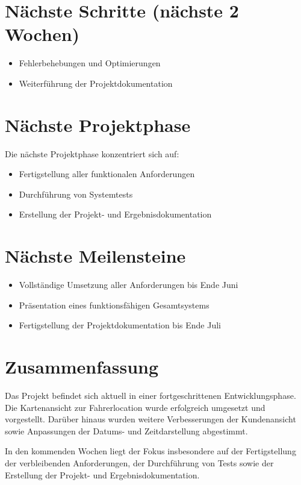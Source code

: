 \documentclass[a4paper,11pt]{article}
\begin{document}
\vspace{0.5cm}

\section{Nächste Schritte (nächste 2 Wochen)}

\begin{itemize}[leftmargin=1.2cm]
\item Fehlerbehebungen und Optimierungen
\item Weiterführung der Projektdokumentation
\end{itemize}

\vspace{0.5cm}

\section{Nächste Projektphase}

Die nächste Projektphase konzentriert sich auf:

\begin{itemize}[leftmargin=1.2cm]
\item Fertigstellung aller funktionalen Anforderungen
\item Durchführung von Systemtests
\item Erstellung der Projekt- und Ergebnisdokumentation
\end{itemize}

\vspace{0.5cm}

\section{Nächste Meilensteine}

\begin{itemize}[leftmargin=1.2cm]
\item Vollständige Umsetzung aller Anforderungen bis Ende Juni
\item Präsentation eines funktionsfähigen Gesamtsystems
\item Fertigstellung der Projektdokumentation bis Ende Juli
\end{itemize}

\vspace{1cm}

\section{Zusammenfassung}

Das Projekt befindet sich aktuell in einer fortgeschrittenen Entwicklungsphase. Die Kartenansicht zur Fahrerlocation wurde erfolgreich umgesetzt und vorgestellt. Darüber hinaus wurden weitere Verbesserungen der Kundenansicht sowie Anpassungen der Datums- und Zeitdarstellung abgestimmt.

In den kommenden Wochen liegt der Fokus insbesondere auf der Fertigstellung der verbleibenden Anforderungen, der Durchführung von Tests sowie der Erstellung der Projekt- und Ergebnisdokumentation.
\end{document}

